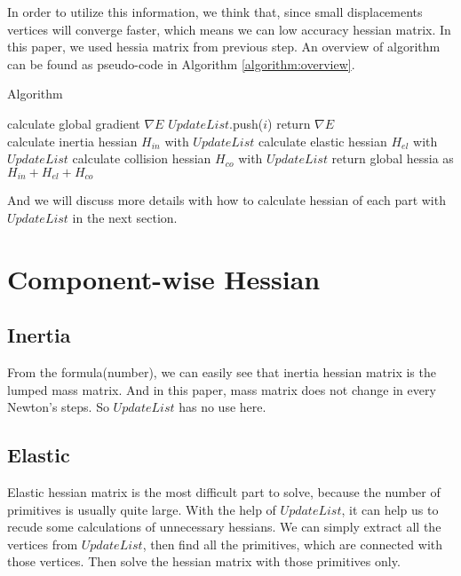 \documentclass[
	11pt, 
	a4paper, 
	oneside,  
	final, 
]{report}
\begin{document}
In order to utilize this information, we think that, since small displacements vertices will converge faster, which means we can low accuracy hessian matrix. In this paper, we used hessia matrix from previous step. An overview of algorithm can be found as pseudo-code in Algorithm \ref{algorithm:overview}.
\begin{algorithm}
	\caption{Algorithm}
	\label{algorithm:overview}
	\begin{algorithmic}[1]
		\State calculate global gradient  $\nabla E$
		\State $UpdateList$.push($i$)
		\EndIf 
		\EndFor
		\State return $\nabla E$
		\EndProcedure\\
		
		\State calculate inertia hessian  $H_{in}$ with $UpdateList$
		\State calculate elastic hessian  $H_{el}$ with $UpdateList$
		\State calculate collision hessian  $H_{co}$ with $UpdateList$
		\State return global hessia as $H_{in}+H_{el}+H_{co}$
		\EndProcedure
		
	\end{algorithmic}
\end{algorithm}

And we will discuss more details with how to calculate hessian of each part with $UpdateList$ in the next section.




\section{Component-wise Hessian}
\subsection{Inertia}
From the formula(number), we can easily see that inertia hessian matrix is the lumped mass matrix. And in this paper, mass matrix does not change in every Newton's steps. So $UpdateList$ has no use here.
\subsection{Elastic}
Elastic hessian matrix is the most difficult part to solve, because the number of primitives is usually quite large. With the help of $UpdateList$, it can help us to recude some calculations of unnecessary hessians. We can simply extract all the vertices from $UpdateList$, then find all the primitives, which are connected with those vertices. Then solve the hessian matrix with those primitives only.
\end{document}
